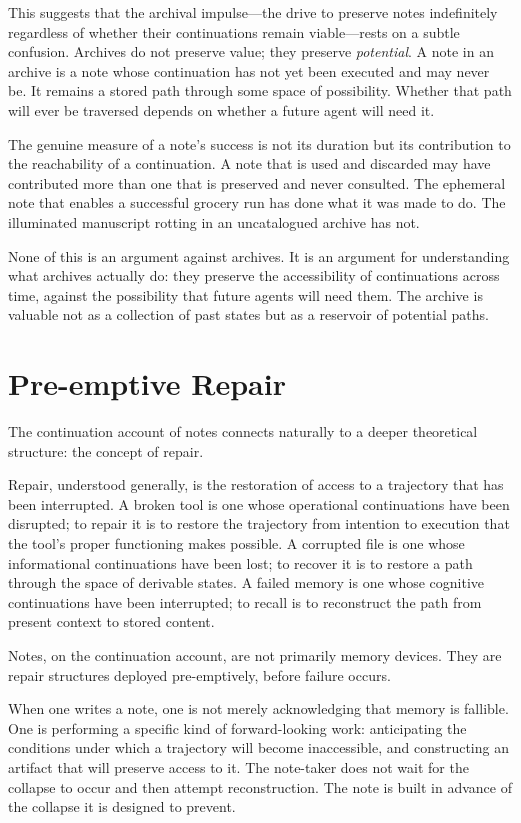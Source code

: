 \documentclass[12pt, a4paper]{article}
\begin{document}
This suggests that the archival impulse---the drive to preserve notes indefinitely
regardless of whether their continuations remain viable---rests on a subtle
confusion. Archives do not preserve value; they preserve \emph{potential}. A note
in an archive is a note whose continuation has not yet been executed and may never
be. It remains a stored path through some space of possibility. Whether that path
will ever be traversed depends on whether a future agent will need it.

The genuine measure of a note's success is not its duration but its contribution
to the reachability of a continuation. A note that is used and discarded may have
contributed more than one that is preserved and never consulted. The ephemeral
note that enables a successful grocery run has done what it was made to do. The
illuminated manuscript rotting in an uncatalogued archive has not.

None of this is an argument against archives. It is an argument for understanding
what archives actually do: they preserve the accessibility of continuations across
time, against the possibility that future agents will need them. The archive is
valuable not as a collection of past states but as a reservoir of potential paths.

\section{Pre-emptive Repair}

The continuation account of notes connects naturally to a deeper theoretical
structure: the concept of repair.

Repair, understood generally, is the restoration of access to a trajectory that
has been interrupted. A broken tool is one whose operational continuations have
been disrupted; to repair it is to restore the trajectory from intention to
execution that the tool's proper functioning makes possible. A corrupted file is
one whose informational continuations have been lost; to recover it is to restore
a path through the space of derivable states. A failed memory is one whose
cognitive continuations have been interrupted; to recall is to reconstruct the
path from present context to stored content.

Notes, on the continuation account, are not primarily memory devices. They are
repair structures deployed pre-emptively, before failure occurs.

When one writes a note, one is not merely acknowledging that memory is fallible.
One is performing a specific kind of forward-looking work: anticipating the
conditions under which a trajectory will become inaccessible, and constructing an
artifact that will preserve access to it. The note-taker does not wait for the
collapse to occur and then attempt reconstruction. The note is built in advance of
the collapse it is designed to prevent.
\end{document}
